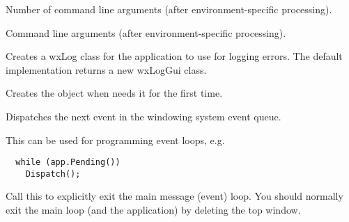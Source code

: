 \label{wxappargc}


Number of command line arguments (after environment-specific processing).


\label{wxappargv}


Command line arguments (after environment-specific processing).


\label{wxappcreatelogtarget}


Creates a wxLog class for the application to use for logging errors. The default
implementation returns a new wxLogGui class.




\label{wxappcreatetraits}


Creates the  object when 
needs it for the first time.




\label{wxappdispatch}


Dispatches the next event in the windowing system event queue.

This can be used for programming event loops, e.g.

\begin{verbatim}
  while (app.Pending())
    Dispatch();
\end{verbatim}




\label{wxappexitmainloop}


Call this to explicitly exit the main message (event) loop.
You should normally exit the main loop (and the application) by deleting
the top window.


\label{wxappfilterevent}

